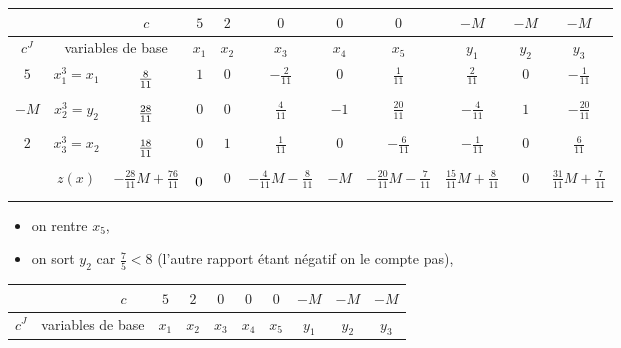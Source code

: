 \begin{td-sol}[]
\begin{enumerate}
\begin{center}
\begin{tabular}{|ccc|cccccccc|}
                & \ &\(c\)&\(5\)&\(2\)&\(0\)&\(0\)&\(0\)&\(-M\)&\(-M\)&\(-M\)\\
                \hline %
                \multicolumn{1}{|c|}{\(c^J\)}& \multicolumn{2}{c|}{variables de base}&\(x_1\)&\(x_2\)&\(x_3\)&\(x_4\)&\(x_5\)&\(y_1\)&\(y_2\)&\(y_3\)\\
                \hline %
                \multicolumn{1}{|c|}{\(5\)}& \multicolumn{1}{c|}{\(x_1^{3}=x_1\)} &\(\vphantom{\dfrac16}\frac{8}{11}\)&\(1\)&\(0\)&\(-\frac{2}{11}\)&\(0\)&\(\frac{1}{11}\)&\(\frac{2}{11}\)&\(0\)&\(-\frac{1}{11}\)\\
                \hline %
                \multicolumn{1}{|c|}{\(-M\)}& \multicolumn{1}{c|}{\(x_2^{3}=y_2\)} &\(\vphantom{\dfrac16}\frac{28}{11}\)&\(0\)&\(0\)&\(\frac{4}{11}\)&\(-1\)&\(\frac{20}{11}\)&\(-\frac{4}{11}\)&\(1\)&\(-\frac{20}{11}\)\\
                \hline %
                \multicolumn{1}{|c|}{\(2\)}& \multicolumn{1}{c|}{\(x_3^{3}=x_2\)} &\(\vphantom{\dfrac16}\frac{18}{11}\)&\(0\)&\(1\)&\(\frac{1}{11}\)&\(0\)&\(-\frac{6}{11}\)&\(-\frac{1}{11}\)&\(0\)&\(\frac{6}{11}\)\\
                \hline %
                \multicolumn{1}{|c|}{} &\(z(x)\)& \multicolumn{1}{|c|}{\(-\frac{28}{11}M + \frac{76}{11}\)} &\(\vphantom{\dfrac16}0\)&\(0\)&\(-\frac{4}{11}M-\frac{8}{11}\)&\(-M\)&\(-\frac{20}{11}M-\frac{7}{11}\)&\(\frac{15}{11}M+\frac{8}{11}\)&\(0\)&\(\frac{31}{11}M+\frac{7}{11}\)\\
                \hline %
            \end{tabular}
        \end{center}
        \begin{itemize}
            \item on rentre \(x_5\),
            \item on sort \(y_2\) car \(\frac{7}{5} < 8\) (l'autre rapport
            étant négatif on le compte pas),
        \end{itemize}
        \begin{center}
            \begin{tabular}{|ccc|cccccccc|} %
                \hline  %
                & \ &\(c\)&\(5\)&\(2\)&\(0\)&\(0\)&\(0\)&\(-M\)&\(-M\)&\(-M\)\\
                \hline %
                \multicolumn{1}{|c|}{\(c^J\)}& \multicolumn{2}{c|}{variables de base}&\(x_1\)&\(x_2\)&\(x_3\)&\(x_4\)&\(x_5\)&\(y_1\)&\(y_2\)&\(y_3\)\\

\end{tabular}
\end{center}
\end{enumerate}
\end{td-sol}
